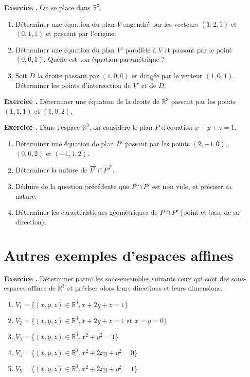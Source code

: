 \documentclass[10pt,a4paper]{article}
\def\bf#1{\textbf{#1}}
\newcounter{nexo}
\newcommand{\exo}{\medskip\noindent \bf{ Exercice \thenexo. \stepcounter{nexo}}}
\def\vect#1{\overrightarrow{\kern-1pt#1\kern 2pt}}
\begin{document}
\exo
On se place dans $\mathbb R^3$.
\begin{enumerate}
  \item D\'eterminer une \'equation du plan $V$ engendr\'e par les vecteurs $(1,2,1)$ et $(0,1,1)$ et passant par l'origine.
  \item D\'eterminer une \'equation du plan $V'$ parall\`ele \`a $V$ et passant par le point $(0,0,1)$. Quelle est son \'equation param\'etrique ?
  \item Soit $D$ la droite passant par $(1,0,0)$ et dirig\'ee par le vecteur $(1,0,1)$. D\'eterminer les points d'intersection de $V'$ et de $D$.
\end{enumerate}

\medskip

\exo
D\'eterminer une \'equation de la droite de $\mathbb R^3$ passant par les points $(1,1,1)$ et $(1,0,2)$.

\medskip

\exo  
Dans l'espace $\mathbb R^3$, on consid\`ere le plan $P$ d'\'equation $x+y+z=1$.
\begin{enumerate}
\item D\'eterminer une \'equation de plan $P'$ passant par les points $(2,-1,0)$, $(0,0,2)$ et $(-1,1,2)$.
\item D\'eterminer la nature de  $\vect P\cap \vect{P'}$.
\item D\'eduire de la question pr\'ec\'edente que $P\cap P'$ est non vide, et pr\'eciser sa nature. 
\item D\'eterminer les caract\'eristiques g\'eom\'etriques de $P\cap P'$ (point et base de sa direction).
\end{enumerate}


\section{Autres exemples d'espaces affines}
\exo
D\'eterminer parmi les sous-ensembles suivants ceux qui sont des sous-espaces affines de $\mathbb R^3$  et pr\'eciser alors leurs directions et leurs dimensions.
\begin{enumerate}
  \item $V_1=\{(x,y,z)\in\mathbb R^3, x+2y+z=1\}$
  \item $V_2=\{(x,y,z)\in\mathbb R^3, x+2y+z=1 \text{ et } x=y=0\}$
  \item  $V_3=\{(x,y,z)\in\mathbb R^3, x^2+y^2=1\}$
  \item  $V_4=\{(x,y,z)\in\mathbb R^3, x^2+2xy+y^2=0\}$ 
  \item $V_5=\{(x,y,z)\in\mathbb R^3, x^2+2xy+y^2=1\}$ 
\end{enumerate}
\end{document}
